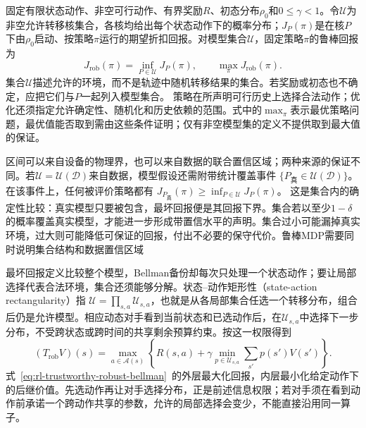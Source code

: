 \begin{definition}[最坏情形回报]
  \label{def:rl-trustworthy-robust-return}
  固定有限状态动作、非空可行动作、有界奖励$R$、初态分布$\rho_0$和$0\leq\gamma<1$。令$\mathcal U$为非空允许转移核集合，各核均给出每个状态动作下的概率分布；$J_P(\pi)$是在核$P$下由$\rho_0$启动、按策略$\pi$运行的期望折扣回报。对模型集合$\mathcal U$，固定策略$\pi$的鲁棒回报为
  \[
    J_{\mathrm{rob}}(\pi)=\inf_{P\in\mathcal U}J_P(\pi),
    \qquad \max_\pi J_{\mathrm{rob}}(\pi).
  \]
  集合$\mathcal U$描述允许的环境，而不是轨迹中随机转移结果的集合。若奖励或初态也不确定，应把它们与$P$一起列入模型集合。
  策略在所声明可行历史上选择合法动作；优化还须指定允许确定性、随机化和历史依赖的范围。式中的$\max_\pi$表示最优策略问题，最优值能否取到需由这些条件证明；仅有非空模型集的定义不提供取到最大值的保证。
\end{definition}

区间可以来自设备的物理界，也可以来自数据的联合置信区域；两种来源的保证不同。若$\mathcal U=\mathcal U(\mathcal D)$来自数据，模型假设还需附带统计覆盖事件
$\{P_{\text{真}}\in\mathcal U(\mathcal D)\}$。在该事件上，任何被评价策略都有
$J_{P_{\text{真}}}(\pi)\geq\inf_{P\in\mathcal U}J_P(\pi)$。
这是集合内的确定性比较：真实模型只要被包含，最坏回报便是其回报下界。集合若以至少$1-\delta$的概率覆盖真实模型，才能进一步形成带置信水平的声明。集合过小可能漏掉真实环境，过大则可能降低可保证的回报，付出不必要的保守代价。鲁棒MDP需要同时说明集合结构和数据置信区域

最坏回报定义比较整个模型，Bellman备份却每次只处理一个状态动作；要让局部选择代表合法环境，集合还须能够分解。状态--动作矩形性（state-action rectangularity）指
$\mathcal U=\prod_{s,a}\mathcal U_{s,a}$，也就是从各局部集合任选一个转移分布，组合后仍是允许模型。相应动态对手看到当前状态和已选动作后，在$\mathcal U_{s,a}$中选择下一步分布，不受跨状态或跨时间的共享剩余预算约束。按这一权限得到
\begin{equation}
  (T_{\mathrm{rob}}V)(s)
    =\max_{a\in\mathcal A(s)}
      \left\{R(s,a)+\gamma
        \min_{p\in\mathcal U_{s,a}}\sum_{s'}p(s')V(s')\right\}.
  \label{eq:rl-trustworthy-robust-bellman}
\end{equation}
式~\eqref{eq:rl-trustworthy-robust-bellman}~的外层最大化回报，内层最小化给定动作下的后继价值。先选动作再让对手选择分布，正是前述信息权限；若对手须在看到动作前承诺一个跨动作共享的参数，允许的局部选择会变少，不能直接沿用同一算子。

